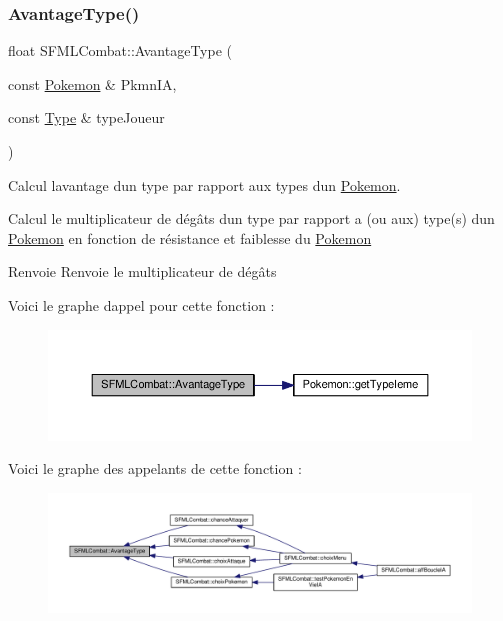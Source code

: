 \subsubsection{\texorpdfstring{Avantage\+Type()}{AvantageType()}}
{\footnotesize\ttfamily float S\+F\+M\+L\+Combat\+::\+Avantage\+Type (\begin{DoxyParamCaption}\item[{const \hyperlink{class_pokemon}{Pokemon} \&}]{Pkmn\+IA,  }\item[{const \hyperlink{_attaque_8h_a1d1cfd8ffb84e947f82999c682b666a7}{Type} \&}]{type\+Joueur }\end{DoxyParamCaption})\hspace{0.3cm}{\ttfamily [private]}}



Calcul l\textquotesingle{}avantage d\textquotesingle{}un type par rapport aux types d\textquotesingle{}un \hyperlink{class_pokemon}{Pokemon}. 

Calcul le multiplicateur de dégâts d\textquotesingle{}un type par rapport a (ou aux) type(s) d\textquotesingle{}un \hyperlink{class_pokemon}{Pokemon} en fonction de résistance et faiblesse du \hyperlink{class_pokemon}{Pokemon} \begin{DoxyReturn}{Renvoie}
Renvoie le multiplicateur de dégâts 
\end{DoxyReturn}
Voici le graphe d\textquotesingle{}appel pour cette fonction \+:\nopagebreak
\begin{figure}[H]
\begin{center}
\leavevmode
\includegraphics[width=350pt]{class_s_f_m_l_combat_a226dd0d639049753aef1fef95cf9a3f0_cgraph}
\end{center}
\end{figure}
Voici le graphe des appelants de cette fonction \+:\nopagebreak
\begin{figure}[H]
\begin{center}
\leavevmode
\includegraphics[width=350pt]{class_s_f_m_l_combat_a226dd0d639049753aef1fef95cf9a3f0_icgraph}
\end{center}
\end{figure}
\mbox{\label{class_s_f_m_l_combat_af3dbb1374820d004fdf5907397760335}} 
